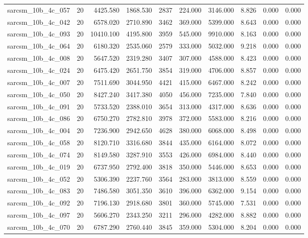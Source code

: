 \begin{tabular}{lrrrrrrrrr}
sarcsm\_10b\_4c\_057 & 20 & 4425.580 & 1868.530 & 2837 & 224.000 & 3146.000 & 8.826 & 0.000 & 0.000 \\
sarcsm\_10b\_4c\_042 & 20 & 6578.020 & 2710.890 & 3462 & 369.000 & 5399.000 & 8.643 & 0.000 & 0.000 \\
sarcsm\_10b\_4c\_093 & 20 & 10410.100 & 4195.800 & 3959 & 545.000 & 9910.000 & 8.163 & 0.000 & 0.000 \\
sarcsm\_10b\_4c\_064 & 20 & 6180.320 & 2535.060 & 2579 & 333.000 & 5032.000 & 9.218 & 0.000 & 0.000 \\
sarcsm\_10b\_4c\_008 & 20 & 5647.520 & 2319.280 & 3407 & 307.000 & 4588.000 & 8.423 & 0.000 & 0.000 \\
sarcsm\_10b\_4c\_024 & 20 & 6475.420 & 2651.750 & 3854 & 319.000 & 4706.000 & 8.857 & 0.000 & 0.000 \\
sarcsm\_10b\_4c\_007 & 20 & 7511.690 & 3044.950 & 4421 & 415.000 & 6467.000 & 8.242 & 0.000 & 0.000 \\
sarcsm\_10b\_4c\_050 & 20 & 8427.240 & 3417.380 & 4050 & 456.000 & 7235.000 & 7.840 & 0.000 & 0.000 \\
sarcsm\_10b\_4c\_091 & 20 & 5733.520 & 2388.010 & 3654 & 313.000 & 4317.000 & 8.636 & 0.000 & 0.000 \\
sarcsm\_10b\_4c\_086 & 20 & 6750.270 & 2782.810 & 3978 & 372.000 & 5583.000 & 8.216 & 0.000 & 0.000 \\
sarcsm\_10b\_4c\_004 & 20 & 7236.900 & 2942.650 & 4628 & 380.000 & 6068.000 & 8.498 & 0.000 & 0.000 \\
sarcsm\_10b\_4c\_058 & 20 & 8120.710 & 3316.680 & 3844 & 435.000 & 6164.000 & 8.072 & 0.000 & 0.000 \\
sarcsm\_10b\_4c\_074 & 20 & 8149.580 & 3287.910 & 3553 & 426.000 & 6984.000 & 8.440 & 0.000 & 0.000 \\
sarcsm\_10b\_4c\_019 & 20 & 6737.950 & 2792.400 & 3818 & 350.000 & 5446.000 & 8.653 & 0.000 & 0.000 \\
sarcsm\_10b\_4c\_052 & 20 & 5306.390 & 2237.760 & 3564 & 283.000 & 3813.000 & 8.559 & 0.000 & 0.000 \\
sarcsm\_10b\_4c\_083 & 20 & 7486.580 & 3051.350 & 3610 & 396.000 & 6362.000 & 9.154 & 0.000 & 0.000 \\
sarcsm\_10b\_4c\_092 & 20 & 7196.130 & 2918.680 & 3801 & 360.000 & 5745.000 & 7.531 & 0.000 & 0.000 \\
sarcsm\_10b\_4c\_097 & 20 & 5606.270 & 2343.250 & 3211 & 296.000 & 4282.000 & 8.882 & 0.000 & 0.000 \\
sarcsm\_10b\_4c\_070 & 20 & 6787.290 & 2760.440 & 3845 & 359.000 & 5304.000 & 8.204 & 0.000 & 0.000 \\

\end{tabular}
